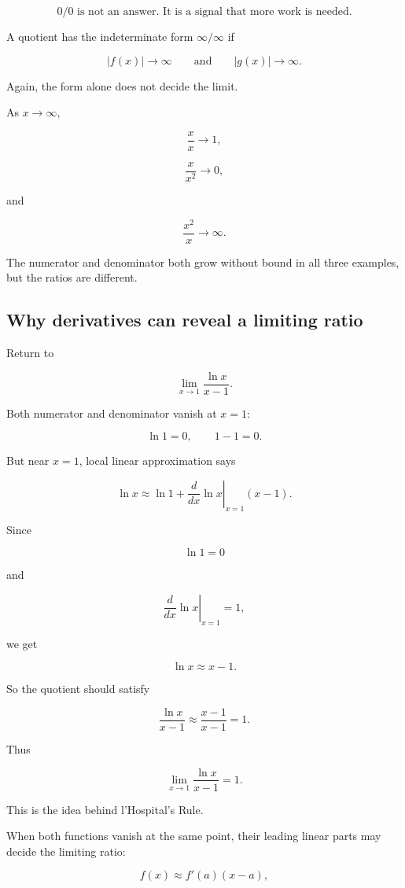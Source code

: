 \[
\boxed{
0/0 \text{ is not an answer.  It is a signal that more work is needed.}
}
\]

A quotient has the indeterminate form \(\infty/\infty\) if

\[
|f(x)|\to\infty
\qquad\text{and}\qquad
|g(x)|\to\infty.
\]

Again, the form alone does not decide the limit.

As \(x\to\infty\),

\[
\frac{x}{x}\to1,
\]

\[
\frac{x}{x^2}\to0,
\]

and

\[
\frac{x^2}{x}\to\infty.
\]

The numerator and denominator both grow without bound in all three examples, but
the ratios are different.

\subsection{Why derivatives can reveal a limiting ratio}
\label{subsec:derivatives-reveal-limiting-ratio}

Return to

\[
\lim_{x\to1}\frac{\ln x}{x-1}.
\]

Both numerator and denominator vanish at \(x=1\):

\[
\ln 1=0,
\qquad
1-1=0.
\]

But near \(x=1\), local linear approximation says

\[
\ln x
\approx
\ln 1+\left.\frac{d}{dx}\ln x\right|_{x=1}(x-1).
\]

Since

\[
\ln 1=0
\]

and

\[
\left.\frac{d}{dx}\ln x\right|_{x=1}=1,
\]

we get

\[
\ln x\approx x-1.
\]

So the quotient should satisfy

\[
\frac{\ln x}{x-1}\approx \frac{x-1}{x-1}=1.
\]

Thus

\[
\lim_{x\to1}\frac{\ln x}{x-1}=1.
\]

This is the idea behind l'Hospital's Rule.

When both functions vanish at the same point, their leading linear parts may decide
the limiting ratio:

\[
f(x)\approx f'(a)(x-a),
\]


